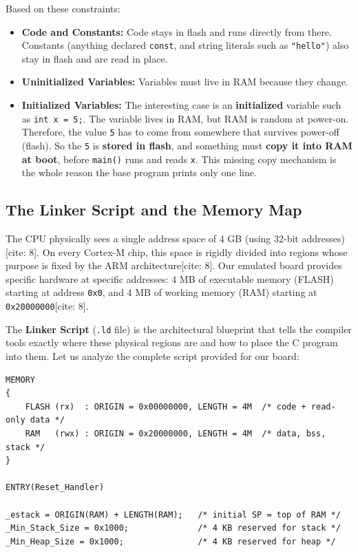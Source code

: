 Based on these constraints:
\begin{itemize}
    \item \textbf{Code and Constants:} Code stays in flash and runs directly from there. Constants (anything declared \texttt{const}, and string literals such as \texttt{"hello"}) also stay in flash and are read in place.
    \item \textbf{Uninitialized Variables:} Variables must live in RAM because they change.
    \item \textbf{Initialized Variables:} The interesting case is an \textbf{initialized} variable such as \texttt{int x = 5;}. The variable lives in RAM, but RAM is random at power-on. Therefore, the value \texttt{5} has to come from somewhere that survives power-off (flash). So the \texttt{5} is \textbf{stored in flash}, and something must \textbf{copy it into RAM at boot}, before \texttt{main()} runs and reads \texttt{x}. This missing copy mechanism is the whole reason the base program prints only one line.
\end{itemize}

\subsection{The Linker Script and the Memory Map}
The CPU physically sees a single address space of 4 GB (using 32-bit addresses)[cite: 8]. On every Cortex-M chip, this space is rigidly divided into regions whose purpose is fixed by the ARM architecture[cite: 8]. Our emulated board provides specific hardware at specific addresses: 4 MB of executable memory (FLASH) starting at address \texttt{0x0}, and 4 MB of working memory (RAM) starting at \texttt{0x20000000}[cite: 8].

The \textbf{Linker Script} (\texttt{.ld} file) is the architectural blueprint that tells the compiler tools exactly where these physical regions are and how to place the C program into them. Let us analyze the complete script provided for our board:

\begin{lstlisting}
MEMORY
{
    FLASH (rx)  : ORIGIN = 0x00000000, LENGTH = 4M  /* code + read-only data */
    RAM   (rwx) : ORIGIN = 0x20000000, LENGTH = 4M  /* data, bss, stack */
}

ENTRY(Reset_Handler)

_estack = ORIGIN(RAM) + LENGTH(RAM);   /* initial SP = top of RAM */
_Min_Stack_Size = 0x1000;              /* 4 KB reserved for stack */
_Min_Heap_Size = 0x1000;               /* 4 KB reserved for heap */
\end{lstlisting}

